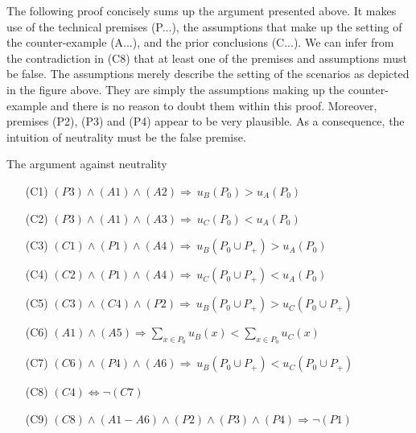 The following proof concisely sums up the argument presented above. It makes use of the technical premises (P...), the assumptions that make up the setting of the counter-example (A...), and the prior conclusions (C...). We can infer from the contradiction in (C8) that at least one of the premises and assumptions must be false. The assumptions merely describe the setting of the scenarios as depicted in the figure above. They are simply the assumptions making up the counter-example and there is no reason to doubt them within this proof. Moreover, premises (P2), (P3) and (P4) appear to be very plausible. As a consequence, the intuition of neutrality must be the false premise. 

\begin{Proof}{The argument against neutrality}{}
\begin{enumerate}
\item[(C1)] \hspace{1cm}
$(P3) \wedge (A1) \wedge (A2) \Rightarrow \ u_B(P_0) > u_A(P_0)$
\item[(C2)] \hspace{1cm}
$(P3) \wedge (A1) \wedge (A3) \Rightarrow \ u_C(P_0) < u_A(P_0)$
\item[(C3)] \hspace{1cm}
$(C1) \wedge (P1) \wedge (A4) \Rightarrow \ u_B(P_0 \cup P_+) > u_A(P_0)$
\item[(C4)] \hspace{1cm}
$(C2) \wedge (P1) \wedge (A4) \Rightarrow \ u_C(P_0 \cup P_+) < u_A(P_0)$
\item[(C5)] \hspace{1cm}
$(C3) \wedge (C4) \wedge (P2) \Rightarrow \ u_B(P_0 \cup P_+) > u_C(P_0 \cup P_+)$
\item[(C6)] \hspace{1cm}
$(A1) \wedge (A5) \Rightarrow \sum_{x\in P_0} u_B(x) < \sum_{x \in P_0} u_C(x)$
\item[(C7)] \hspace{1cm}
$(C6) \wedge (P4) \wedge (A6) \Rightarrow  \ u_B(P_0 \cup P_+) < u_C(P_0 \cup P_+)$
\item[(C8)] \hspace{1cm}
$(C4) \Leftrightarrow \neg (C7)$
\item[(C9)] \hspace{1cm}
$(C8) \wedge (A1-A6) \wedge (P2) \wedge (P3) \wedge (P4) \Rightarrow \neg (P1)$
\end{enumerate}
\end{Proof}

